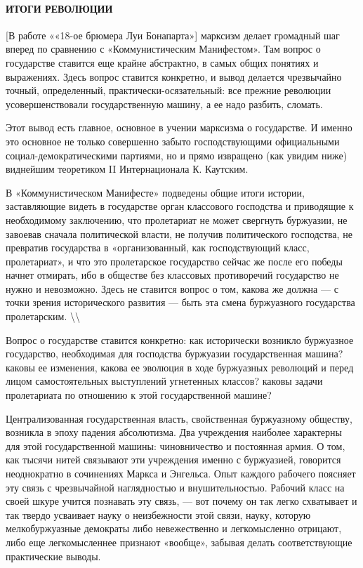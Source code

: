 \documentclass[12pt]{article}
\newcommand\ellipsis{%
  \textbackslash\thinspace\textellipsis\textbackslash
}
\newcommand{\parnum}{(\arabic{parcount})}
\newcounter{parcount}
\newenvironment{parnumbers}{%
  \par%
  \everypar{\noindent \stepcounter{parcount}\marginpar[]{\parnum}}%
}{}
\begin{document}
\paragraph{ИТОГИ РЕВОЛЮЦИИ}
\begin{parnumbers}
[В работе ««18-ое брюмера Луи Бонапарта»] марксизм делает громадный шаг вперед по сравнению с «Коммунистическим Манифестом». Там вопрос о государстве ставится еще крайне абстрактно, в самых общих понятиях и выражениях. Здесь вопрос ставится конкретно, и вывод делается чрезвычайно точный, определенный, практически-осязательный: все прежние революции усовершенствовали государственную машину, а ее надо разбить, сломать.

Этот вывод есть главное, основное в учении марксизма о государстве. И именно это основное не только совершенно забыто господствующими официальными социал-демократическими партиями, но и прямо извращено (как увидим ниже) виднейшим теоретиком II Интернационала К. Каутским.

В «Коммунистическом Манифесте» подведены общие итоги истории, заставляющие видеть в государстве орган классового господства и приводящие к необходимому заключению, что пролетариат не может свергнуть буржуазии, не завоевав сначала политической власти, не получив политического господства, не превратив государства в «организованный, как господствующий класс, пролетариат», и что это пролетарское государство сейчас же после его победы начнет отмирать, ибо в обществе без классовых противоречий государство не нужно и невозможно. Здесь не ставится вопрос о том, какова же должна — с точки зрения исторического развития — быть эта смена буржуазного государства пролетарским. \ellipsis

Вопрос о государстве ставится конкретно: как исторически возникло буржуазное государство, необходимая для господства буржуазии государственная машина? каковы ее изменения, какова ее эволюция в ходе буржуазных революций и перед лицом самостоятельных выступлений угнетенных классов? каковы задачи пролетариата по отношению к этой государственной машине?

Централизованная государственная власть, свойственная буржуазному обществу, возникла в эпоху падения абсолютизма. Два учреждения наиболее характерны для этой государственной машины: чиновничество и постоянная армия. О том, как тысячи нитей связывают эти учреждения именно с буржуазией, говорится неоднократно в сочинениях Маркса и Энгельса. Опыт каждого рабочего поясняет эту связь с чрезвычайной наглядностью и внушительностью. Рабочий класс на своей шкуре учится познавать эту связь, — вот почему он так легко схватывает и так твердо усваивает науку о неизбежности этой связи, науку, которую мелкобуржуазные демократы либо невежественно и легкомысленно отрицают, либо еще легкомысленнее признают «вообще», забывая делать соответствующие практические выводы.


\end{parnumbers}
\end{document}
